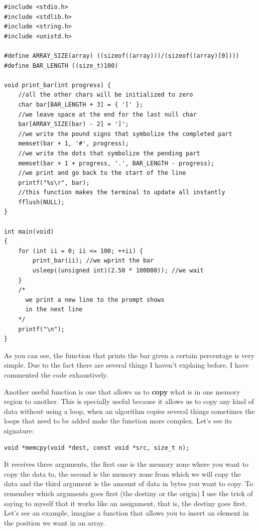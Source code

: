 \documentclass[a4paper]{article}
\begin{document}
\noindent
\begin{minipage}[H]{\linewidth}
\mbox{}
\begin{lstlisting}[style=C,
caption={Use of the function \texttt{memset}},
label={lst:memsetExample}]
#include <stdio.h>
#include <stdlib.h>
#include <string.h>
#include <unistd.h>

#define ARRAY_SIZE(array) ((sizeof((array)))/(sizeof((array)[0])))
#define BAR_LENGTH ((size_t)100)

void print_bar(int progress) {
    //all the other chars will be initialized to zero
    char bar[BAR_LENGTH + 3] = { '[' };
    //we leave space at the end for the last null char
    bar[ARRAY_SIZE(bar) - 2] = ']';
    //we write the pound signs that symbolize the completed part
    memset(bar + 1, '#', progress);
    //we write the dots that symbolize the pending part
    memset(bar + 1 + progress, '.', BAR_LENGTH - progress);
    //we print and go back to the start of the line
    printf("%s\r", bar);
    //this function makes the terminal to update all instantly
    fflush(NULL);
}

int main(void)
{
    for (int ii = 0; ii <= 100; ++ii) {
        print_bar(ii); //we wprint the bar
        usleep((unsigned int)(2.50 * 100000)); //we wait
    }
    /*
      we print a new line to the prompt shows
      in the next line
    */
    printf("\n");
}
\end{lstlisting}
\end{minipage}

As you can see, the function that prints the bar given a certain percentage is
very simple. Due to the fact there are several things I haven't explaing before,
I have commented the code exhaustively.

Another useful function is one that allows us to \textbf{copy} what is in one
memory region to another. This is specially useful because it allows us to copy
any kind of data without using a loop, when an algorithm copies several things
sometimes the loops that need to be added make the function more complex.
Let's see its signature:

\noindent
\begin{minipage}[H]{\linewidth}
\mbox{}
\begin{lstlisting}[style=C,
caption={Signature of function \texttt{memcpy}},
label={lst:memcpy}]
void *memcpy(void *dest, const void *src, size_t n);
\end{lstlisting}
\end{minipage}

It receives three arguments, the first one is the memory zone where you want to
copy the data to, the second is the memory zone from which we will copy the data
and the third argument is the amount of data in bytes you want to copy. To
remember which arguments goes first (the destiny or the origin) I use the trick
of saying to myself that it works like an assignment, that is, the destiny goes
first. Let's see an example, imagine a function that allows you to insert an
element in the position we want in an array.
\end{document}
